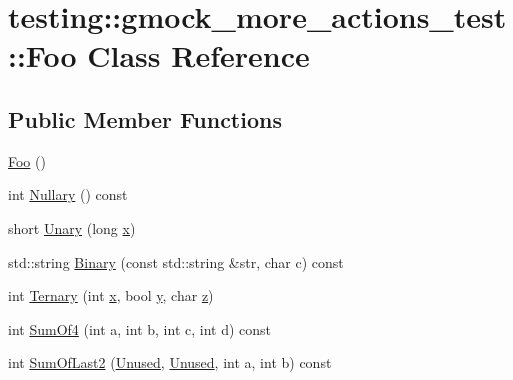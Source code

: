 \hypertarget{classtesting_1_1gmock__more__actions__test_1_1_foo}{}\section{testing\+::gmock\+\_\+more\+\_\+actions\+\_\+test\+::Foo Class Reference}
\label{classtesting_1_1gmock__more__actions__test_1_1_foo}
\subsection*{Public Member Functions}
\begin{DoxyCompactItemize}
\item 
\mbox{\hyperlink{classtesting_1_1gmock__more__actions__test_1_1_foo_ad2603a65b94e019c75f4227787b9177e}{Foo}} ()
\item 
int \mbox{\hyperlink{classtesting_1_1gmock__more__actions__test_1_1_foo_ad6ba38dbb9b1594ac178630f07c4baa5}{Nullary}} () const
\item 
short \mbox{\hyperlink{classtesting_1_1gmock__more__actions__test_1_1_foo_a68d2b46d6cc7d51979b0254940af6090}{Unary}} (long \mbox{\hyperlink{_obj__test_2lib_2googletest-master_2googlemock_2test_2gmock-matchers__test_8cc_a6150e0515f7202e2fb518f7206ed97dc}{x}})
\item 
std\+::string \mbox{\hyperlink{classtesting_1_1gmock__more__actions__test_1_1_foo_a8ee56742c6c025af680617464c71ecef}{Binary}} (const std\+::string \&str, char c) const
\item 
int \mbox{\hyperlink{classtesting_1_1gmock__more__actions__test_1_1_foo_afc5b86988210ad598fa3a2a9822297e4}{Ternary}} (int \mbox{\hyperlink{_obj__test_2lib_2googletest-master_2googlemock_2test_2gmock-matchers__test_8cc_a6150e0515f7202e2fb518f7206ed97dc}{x}}, bool \mbox{\hyperlink{_obj__test_2lib_2googletest-master_2googlemock_2test_2gmock-matchers__test_8cc_a39cb44155237f0205e0feb931d5acbed}{y}}, char \mbox{\hyperlink{_obj__test_2lib_2googletest-master_2googlemock_2test_2gmock-matchers__test_8cc_a196ff6a287f53f758b1506f21269fc77}{z}})
\item 
int \mbox{\hyperlink{classtesting_1_1gmock__more__actions__test_1_1_foo_a69ca68e84528904032bad9533a23fb0a}{Sum\+Of4}} (int a, int b, int c, int d) const
\item 
int \mbox{\hyperlink{classtesting_1_1gmock__more__actions__test_1_1_foo_abc041eb7a8e8211656495f2540f315ec}{Sum\+Of\+Last2}} (\mbox{\hyperlink{namespacetesting_a603e329ec0263ebfcf16f712810bd511}{Unused}}, \mbox{\hyperlink{namespacetesting_a603e329ec0263ebfcf16f712810bd511}{Unused}}, int a, int b) const

\end{DoxyCompactItemize}
